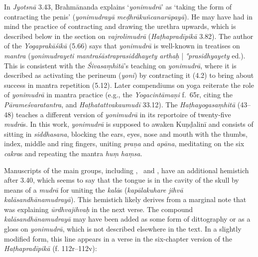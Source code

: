\begin{ekdosis}
\begin{philcomm}[hp03_040]


In \emph{Jyotsnā} 3.43, Brahmānanda explains `\emph{yonimudrā}' as `taking the form of contracting the penis' (\emph{yonimudrayā meḍhrākuñcanarūpayā}). He may have had in mind the practice of contracting and drawing the urethra upwards, which is described below in the section on \emph{vajrolimudrā} (\emph{Haṭhapradīpikā} 3.82). The author of the \emph{Yogaprakāśikā} (5.66) says that \emph{yonimudrā} is well-known in treatises on \emph{mantra} (\emph{yonimudrayeti mantraśāstraprasiddhayety arthaḥ} | \emph{°prasidhyayety} ed.). This is consistent with the \emph{Śivasaṃhitā}'s teaching on \emph{yonimudrā}, where it is described as activating the perineum (\emph{yoni}) by contracting it (4.2) to bring about success in mantra repetition (5.12). Later compendiums on yoga reiterate the role of \emph{yonimudrā} in mantra practice (e.g., the \emph{Yogacintāmaṇi} f.~65r, citing the \emph{Pārameśvaratantra}, and \emph{Haṭhatattvakaumudī} 33.12). The \emph{Haṭhayogasaṃhitā} (43–48) teaches a different version of \emph{yonimudrā} in its reportoire of twenty-five \emph{mudrā}s. In this work, \emph{yonimudrā} is supposed to awaken Kuṇḍalinī and consists of sitting in \emph{siddhasana}, blocking the ears, eyes, nose and mouth with the thumbs, index, middle and ring fingers, uniting \emph{praṇa} and \emph{apāna}, meditating on the six \emph{cakra}s and repeating the mantra \emph{huṃ haṃsa}. \lb

Manuscripts of the main groups, including \textalpha, \textbeta\ and \textgamma, have an additional hemistich after 3.40, which seems to say that the tongue is in the cavity of the skull by means of a \emph{mudrā} for uniting the \emph{kalā}s (\emph{kapālakuhare jihvā kalāsandhānamudrayā}). This hemistich likely derives from a marginal note that was explaining \emph{ūrdhvajihvaḥ} in the next verse. The compound \emph{kalāsandhānamudrayā} may have been added as some form of dittography or as a gloss on \emph{yonimudrā}, which is not described elsewhere in the text. In a slightly modified form, this line appears in a verse in the six-chapter version of the \emph{Haṭhapradīpikā} (f. 112r–112v):

\begin{versinnote}
\end{versinnote}



\end{philcomm}
\end{ekdosis}
